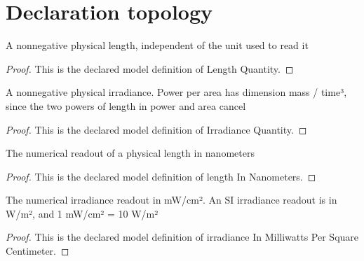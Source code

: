 \section{Declaration topology}
\begin{definition}
  \label{def:physics:phyx-mini-0082:phyxminiproblems-problemphyxmini0082-lengthquantity}
  A nonnegative physical length, independent of the unit used to read it
\end{definition}
\begin{proof}
  This is the declared model definition of Length Quantity.
\end{proof}
\begin{definition}
  \label{def:physics:phyx-mini-0082:phyxminiproblems-problemphyxmini0082-irradiancequantity}
  A nonnegative physical irradiance. Power per area has dimension mass / time³, since the two powers of length in power and area cancel
\end{definition}
\begin{proof}
  This is the declared model definition of Irradiance Quantity.
\end{proof}
\begin{definition}
  \label{def:physics:phyx-mini-0082:phyxminiproblems-problemphyxmini0082-lengthinnanometers}
  The numerical readout of a physical length in nanometers
\end{definition}
\begin{proof}
  This is the declared model definition of length In Nanometers.
\end{proof}
\begin{definition}
  \label{def:physics:phyx-mini-0082:phyxminiproblems-problemphyxmini0082-irradianceinmilliwattspersquarecentimeter}
  The numerical irradiance readout in mW/cm². An SI irradiance readout is in W/m², and 1 mW/cm² = 10 W/m²
\end{definition}
\begin{proof}
  This is the declared model definition of irradiance In Milliwatts Per Square Centimeter.
\end{proof}
